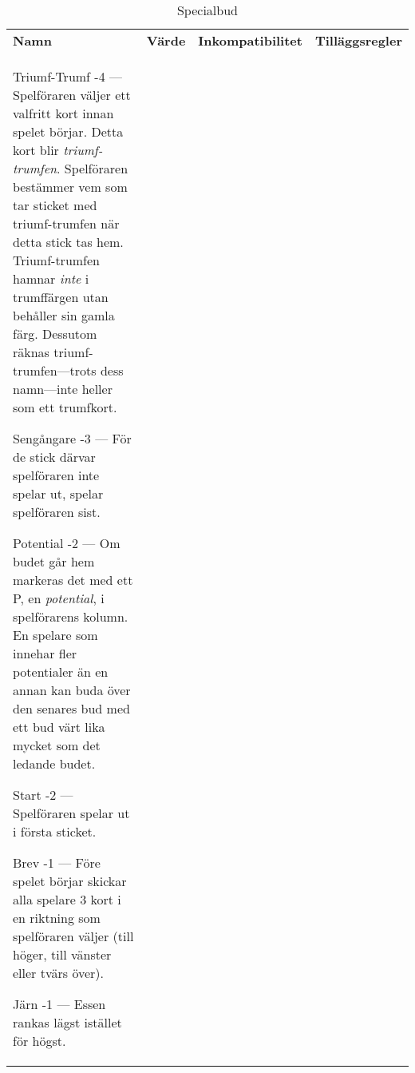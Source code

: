 %
%
%
%

\begin{table}
	\caption{Specialbud}\label{tab:specialBids}
	\begin{center}
		\begin{tabularx}{\textwidth}{
			l
			S[table-number-alignment=center, table-format=1.0]
			p{3cm}
			|X
		}
			\textbf{Namn} &
			\textbf{Värde} &
			\textbf{Inkompatibilitet} &
			\textbf{Tilläggsregler}
			\\[-3ex]

			\specialBidItem%
			{Triumf-Trumf}
			{-4}
			{---}
			{%
				Spelföraren väljer ett valfritt kort innan spelet börjar. Detta kort blir \emph{triumf-trumfen}. Spelföraren bestämmer vem som tar sticket med triumf-trumfen när detta stick tas hem. Triumf-trumfen hamnar \emph{inte} i trumffärgen utan behåller sin gamla färg. Dessutom räknas triumf-trumfen---trots dess namn---inte heller som ett trumfkort.
			}

			\specialBidItem%
			{Sengångare}
			{-3}
			{---}
			{%
				För de stick därvar spelföraren inte spelar ut, spelar spelföraren sist.
			}

			\specialBidItem%
			{Potential}
			{-2}
			{---}
			{%
				Om budet går hem markeras det med ett P, en \emph{potential}, i spelförarens kolumn. En spelare som innehar fler potentialer än en annan kan buda över den senares bud med ett bud värt lika mycket som det ledande budet.
			}

			\specialBidItem%
			{Start}
			{-2}
			{---}
			{%
				Spelföraren spelar ut i första sticket.
			}

			\specialBidItem%
			{Brev}
			{-1}
			{---}
			{%
				Före spelet börjar skickar alla spelare 3 kort i en riktning som spelföraren väljer (till höger, till vänster eller tvärs över).
			}

			\specialBidItem%
			{Järn}
			{-1}
			{---}
			{%
				Essen rankas lägst istället för högst.
			}


\end{tabularx}
\end{center}
\end{table}
